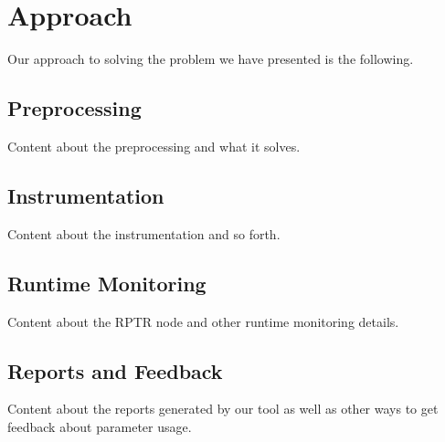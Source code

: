 \section{Approach}

Our approach to solving the problem we have presented is the following.


\subsection{Preprocessing}

Content about the preprocessing and what it solves.


\subsection{Instrumentation}

Content about the instrumentation and so forth.


\subsection{Runtime Monitoring}

Content about the RPTR node and other runtime monitoring details.


\subsection{Reports and Feedback}

Content about the reports generated by our tool as well as other ways to get feedback about parameter usage.
